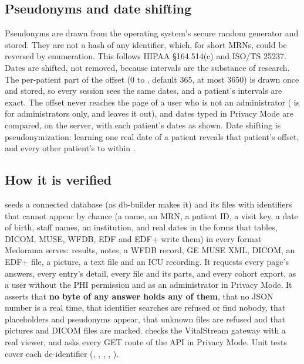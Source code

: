 \subsection{Pseudonyms and date shifting}
\label{sec:security-pseudonyms}

Pseudonyms are drawn from the operating system's secure random generator and stored. They are not
a hash of any identifier, which, for short MRNs, could be reversed by enumeration. This follows
HIPAA \S164.514(c) and ISO/TS 25237. Dates are shifted, not removed, because intervals are the
substance of research. The per-patient part of the offset (0 to , default 365,
at most 3650) is drawn once and stored, so every session sees the same dates, and a patient's
intervals are exact. The offset never reaches the page of a user who is not an administrator
( is for administrators only, and  leaves it out), and dates
typed in Privacy Mode are compared, on the server, with each patient's dates as shown. Date
shifting is pseudonymization: learning one real date of a patient reveals that patient's
offset, and every other patient's to within .

\subsection{How it is verified}
\label{sec:security-privacy-verified}

 seeds a connected database (as db-builder makes it) and its
files with identifiers that cannot appear by chance (a name, an MRN, a patient ID, a visit key, a
date of birth, staff names, an institution, and real dates in the forms that tables, DICOM, MUSE,
WFDB, EDF and EDF+ write them) in every format Medorama serves: results, notes, a WFDB record, GE
MUSE XML, DICOM, an EDF+ file, a picture, a text file and an ICU recording. It requests every
page's answers, every entry's detail, every file and its parts, and every cohort export, as a user without
the PHI permission and as an administrator in Privacy Mode. It asserts that \textbf{no byte of any
answer holds any of them}, that no JSON number is a real time, that identifier searches are
refused or find nobody, that placeholders and pseudonyms appear, that unknown files are refused
and that pictures and DICOM files are marked.  checks the VitalStream
gateway with a real viewer, and  asks every GET route of
the API in Privacy Mode. Unit tests cover each de-identifier (, ,
, , ).

